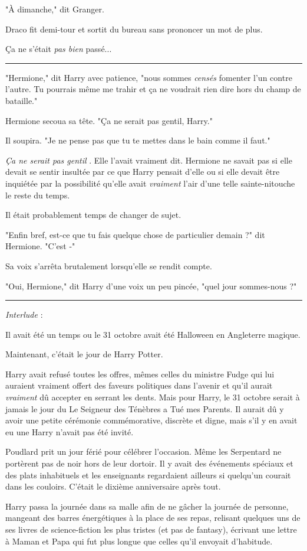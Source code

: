 "À dimanche," dit Granger.

Draco fit demi-tour et sortit du bureau sans prononcer un mot de plus.

Ça ne s'était \emph{pas bien}  passé...
\par\noindent\rule{\textwidth}{0.4pt}
"Hermione," dit Harry avec patience, "nous sommes \emph{censés}  fomenter l'un contre l'autre. Tu pourrais même me trahir et ça ne voudrait rien dire hors du champ de bataille."

Hermione secoua sa tête. "Ça ne serait pas gentil, Harry."

Il soupira. "Je ne pense pas que tu te mettes dans le bain comme il faut."

\emph{Ça ne serait pas gentil} . Elle l'avait vraiment dit. Hermione ne savait pas si elle devait se sentir insultée par ce que Harry pensait d'elle ou si elle devait être inquiétée par la possibilité qu'elle avait \emph{vraiment}  l'air d'une telle sainte-nitouche le reste du temps.

Il était probablement temps de changer de sujet.

"Enfin bref, est-ce que tu fais quelque chose de particulier demain ?" dit Hermione. "C'est -"

Sa voix s'arrêta brutalement lorsqu'elle se rendit compte.

"Oui, Hermione," dit Harry d'une voix un peu pincée, "quel jour sommes-nous ?"
\par\noindent\rule{\textwidth}{0.4pt}
\emph{Interlude}  :

Il avait été un temps ou le 31 octobre avait été Halloween en Angleterre magique.

Maintenant, c'était le jour de Harry Potter.

Harry avait refusé toutes les offres, mêmes celles du ministre Fudge qui lui auraient vraiment offert des faveurs politiques dans l'avenir et qu'il aurait \emph{vraiment}  dû accepter en serrant les dents. Mais pour Harry, le 31 octobre serait à jamais le jour du Le Seigneur des Ténèbres a Tué mes Parents. Il aurait dû y avoir une petite cérémonie commémorative, discrète et digne, mais s'il y en avait eu une Harry n'avait pas été invité.

Poudlard prit un jour férié pour célébrer l'occasion. Même les Serpentard ne portèrent pas de noir hors de leur dortoir. Il y avait des événements spéciaux et des plats inhabituels et les enseignants regardaient ailleurs si quelqu'un courait dans les couloirs. C'était le dixième anniversaire après tout.

Harry passa la journée dans sa malle afin de ne gâcher la journée de personne, mangeant des barres énergétiques à la place de ses repas, relisant quelques uns de ses livres de science-fiction les plus tristes (et pas de fantasy), écrivant une lettre à Maman et Papa qui fut plus longue que celles qu'il envoyait d'habitude.

